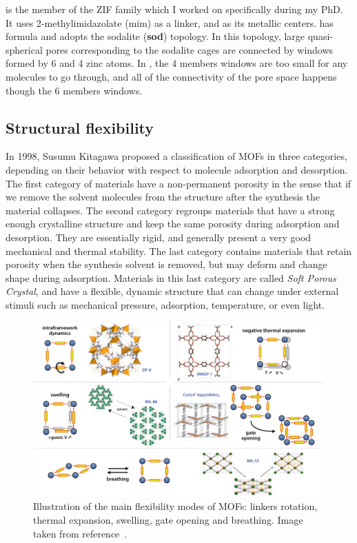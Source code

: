 \documentclass[thesis]{subfiles}
\begin{document}
 is the member of the ZIF family which I worked on specifically during my
PhD. It uses 2-methylimidazolate (mim) as a linker, and  as its
metallic centers.  has formula  and adopts the sodalite
(\textbf{sod}) topology. In this topology, large quasi-spherical pores
corresponding to the sodalite cages are connected by windows formed by 6 and 4
zinc atoms. In , the 4 members windows are too small for any molecules to
go through, and all of the connectivity of the pore space happens though the 6
members windows.

\subsection{Structural flexibility}

In 1998, Susumu Kitagawa proposed a classification of MOFs in three
categories\cite{Horike2009}, depending on their behavior with respect to
molecule adsorption and desorption. The first category of materials have a
non-permanent porosity in the sense that if we remove the solvent molecules from
the structure after the synthesis the material collapses. The second category
regroups materials that have a strong enough crystalline structure and keep the
same porosity during adsorption and desorption. They are essentially rigid, and
generally present a very good mechanical and thermal stability. The last
category contains materials that retain porosity when the synthesis solvent is
removed, but may deform and change shape during adsorption.  Materials in this
last category are called \emph{Soft Porous Crystal}, and have a flexible,
dynamic structure that can change under external stimuli such as mechanical
pressure, adsorption, temperature, or even light\cite{Kitagawa2005,
Coudert2015}.

\begin{figure}[ht]
    \centering
    \includegraphics[width=\textwidth]{figures/cited/mof-flexibility}
    \caption{Illustration of the main flexibility modes of MOFs: linkers
    rotation, thermal expansion, swelling, gate opening and breathing. Image
    taken from reference~\cite{Coudert2011}.}
    \label{fig:mof-flexibility}
\end{figure}
\end{document}
